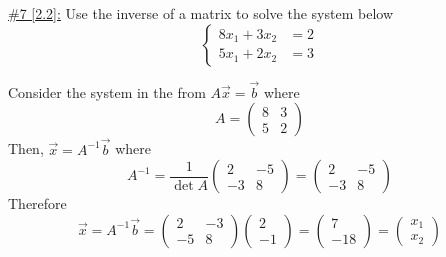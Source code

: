 \documentclass{exam}
\begin{document}
\underline{\#7 [2.2]:} Use the inverse of a matrix to solve the system below
\[
    \begin{cases}
        8x_1 + 3x_2 &= 2 \\
        5x_1 + 2x_2 &= 3
    \end{cases}
\]
\begin{solution}
    Consider the system in the from $A\vec{x}=\vec{b}$ where
    \[
        A = \begin{pmatrix}
            8 & 3 \\ 5 & 2
        \end{pmatrix} 
    \]
    Then, $\vec{x}=A^{-1}\vec{b}$ where
    \[
        A^{-1} = \frac{1}{\mathop{\det}A}\begin{pmatrix}
            2 & -5 \\ 
            -3 & 8
        \end{pmatrix} 
        =
        \begin{pmatrix}
            2 & -5 \\
            -3 & 8
        \end{pmatrix}
    \]
    Therefore
    \[
        \vec{x} = A^{-1}\vec{b} = 
        \begin{pmatrix}
            2 & -3 \\
            -5 & 8
        \end{pmatrix}
        \begin{pmatrix}
            2 \\ -1
        \end{pmatrix}
        = 
        \boxed{\begin{pmatrix}
            7 \\ -18
        \end{pmatrix}
        = 
        \begin{pmatrix}
            x_1 \\ x_2
        \end{pmatrix}}
    \]
\end{solution}
\end{document}
